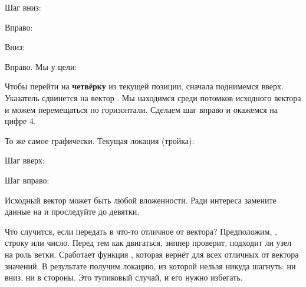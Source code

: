 Шаг вниз:

\begin{figure}[H]
  \centering
  
  \label{fig:chart-zip-05}
\end{figure}

\pagebreaklarge

Вправо:

\begin{figure}[H]
  \centering
  
  \label{fig:chart-zip-06}
\end{figure}

Вниз:

\begin{figure}[H]
  \centering
  
  \label{fig:chart-zip-07}
\end{figure}

Вправо. Мы у цели:

\begin{figure}[H]
  \centering
  
  \label{fig:chart-zip-08}
\end{figure}

Чтобы перейти на \textbf{четвёрку} из текущей позиции, сначала поднимемся
вверх. Указатель сдвинется на вектор \code{[2 3]}. Мы находимся среди потомков
исходного вектора и можем перемещаться по горизонтали. Сделаем шаг вправо и
окажемся на цифре 4.

\pagebreaklarge

То же самое графически. Текущая локация (тройка):

\begin{figure}[H]
  \centering
  
  \label{fig:chart-zip-09}
\end{figure}

Шаг вверх:

\begin{figure}[H]
  \centering
  
  \label{fig:chart-zip-10}
\end{figure}

Шаг вправо:

\begin{figure}[H]
  \centering
  
  \label{fig:chart-zip-11}
\end{figure}

Исходный вектор может быть любой вложенности. Ради интереса замените данные на
 и проследуйте до девятки.

Что случится, если передать в  что-то отличное от вектора?
Предположим, , строку или число. Перед тем как двигаться, зиппер проверит,
подходит ли узел на роль ветки. Сработает функция , которая вернёт
 для всех отличных от вектора значений. В результате получим локацию, из
которой нельзя никуда шагнуть: ни вниз, ни в стороны. Это тупиковый случай, и
его нужно избегать.

